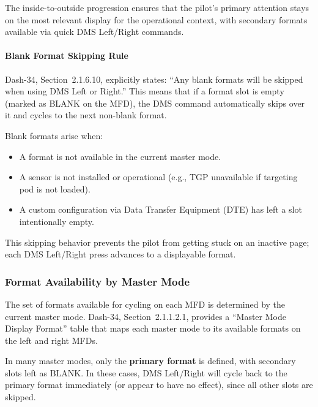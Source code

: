 \documentclass[11pt,a4paper]{article}
\begin{document}
The inside-to-outside progression ensures that the pilot's primary attention stays on the most relevant display for the operational context, with secondary formats available via quick DMS Left/Right commands.

\paragraph*{Blank Format Skipping Rule}

Dash-34, Section~2.1.6.10, explicitly states: ``Any blank formats will be skipped when using DMS Left or Right.'' This means that if a format slot is empty (marked as BLANK on the MFD), the DMS command automatically skips over it and cycles to the next non-blank format.

Blank formats arise when:

\begin{itemize}

\item A format is not available in the current master mode.

\item A sensor is not installed or operational (e.g., TGP unavailable if targeting pod is not loaded).

\item A custom configuration via Data Transfer Equipment (DTE) has left a slot intentionally empty.

\end{itemize}

This skipping behavior prevents the pilot from getting stuck on an inactive page; each DMS Left/Right press advances to a displayable format.

\subsubsection{Format Availability by Master Mode}
\label{sec:C4-S3-S2}

The set of formats available for cycling on each MFD is determined by the current master mode. Dash-34, Section~2.1.1.2.1, provides a ``Master Mode Display Format'' table that maps each master mode to its available formats on the left and right MFDs.

In many master modes, only the \textbf{primary format} is defined, with secondary slots left as BLANK. In these cases, DMS Left/Right will cycle back to the primary format immediately (or appear to have no effect), since all other slots are skipped.
\end{document}
